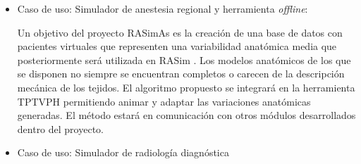 \begin{itemize}





\begin{itemize}
    \item 	Caso de uso: Simulador de anestesia regional y herramienta \emph{offline}:
    
    Un objetivo del proyecto \ac{RASimAs} es la creación de una base de datos con pacientes virtuales que representen una variabilidad anatómica media que posteriormente será utilizada en \ac{RASim} . Los modelos anatómicos de los que se disponen no siempre se encuentran completos o carecen de la descripción mecánica de los tejidos. 
    El algoritmo propuesto se integrará en la herramienta \ac{TPTVPH} permitiendo animar y adaptar las variaciones anatómicas generadas. El método estará en comunicación con otros módulos desarrollados dentro del proyecto.  


    

    \item Caso de uso: Simulador de radiología diagnóstica


\end{itemize}
\end{itemize}
